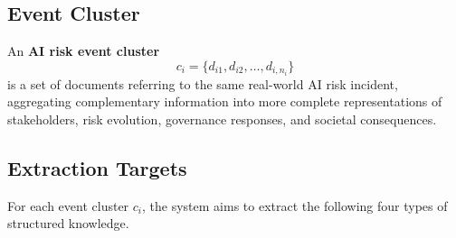 \documentclass[a4paper,fleqn]{cas-dc}
\begin{document}
\subsection{Event Cluster}

An \textbf{AI risk event cluster}
\begin{equation}
  c_i = \{d_{i1}, d_{i2}, \ldots, d_{i,n_i}\}
\end{equation}
is a set of documents referring to the same real-world AI risk
incident, aggregating complementary information into more complete
representations of stakeholders, risk evolution, governance
responses, and societal consequences.

\subsection{Extraction Targets}

For each event cluster $c_i$, the system aims to extract the
following four types of structured knowledge.
\end{document}
